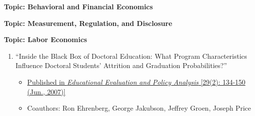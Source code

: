 \documentclass[11pt]{article}
\begin{document}
\medskip
\vspace*{.2in}
{\bf Topic: Behavioral and Financial Economics} \\
\vspace*{-.2in}
\begin{enumerate}
    
\end{enumerate}

\medskip
\vspace*{.2in}
{\bf Topic: Measurement, Regulation, and Disclosure} \\
\vspace*{-.2in}
\begin{enumerate}
     
\end{enumerate}

\medskip
\vspace*{.1in}
{\bf Topic: Labor Economics} \\
\vspace*{-.2in}
\begin{enumerate}
\item``Inside the Black Box of Doctoral Education: What Program Characteristics Influence Doctoral Students' Attrition and Graduation Probabilities?''
\begin{itemize}
\vspace*{-.07in}
	\item \href{https://www.jstor.org/stable/30128037?seq=1#page_scan_tab_contents}{Published in {\it Educational Evaluation and Policy Analysis} [29(2): 134-150 (Jun., 2007)]}
\vspace*{-.07in}
	\item Coauthors: Ron Ehrenberg, George Jakubson, Jeffrey Groen, Joseph Price
\end{itemize}
\end{enumerate}
\end{document}
